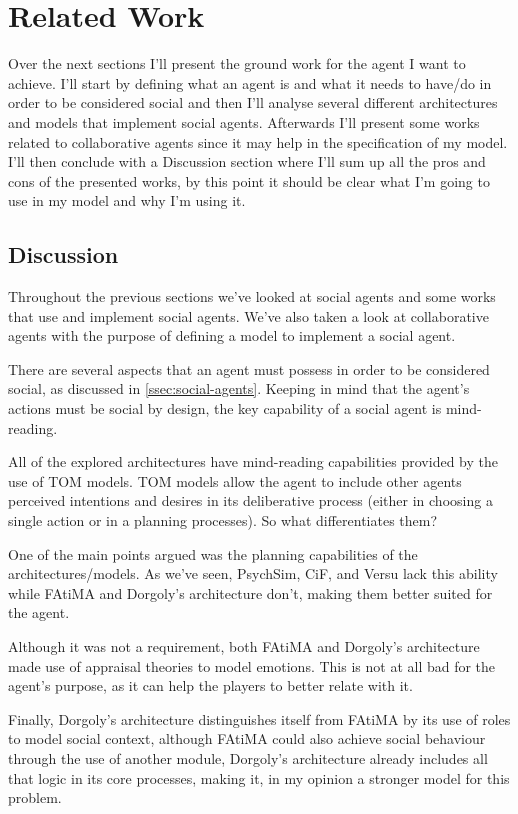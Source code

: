 \section{Related Work}
Over the next sections I'll present the ground work for the agent I want to achieve.
I'll start by defining what an agent is and what it needs to have/do in order to be considered social and then I'll analyse several different architectures and models that implement social agents.
Afterwards I'll present some works related to collaborative agents since it may help in the specification of my model.
I'll then conclude with a Discussion section where I'll sum up all the pros and cons of the presented works, by this point it should be clear what I'm going to use in my model and why I'm using it.












\subsection{Discussion}
Throughout the previous sections we've looked at social agents and some works that use and implement social agents.
We've also taken a look at collaborative agents with the purpose of defining a model to implement a social agent.

There are several aspects that an agent must possess in order to be considered social, as discussed in \ref{ssec:social-agents}.
Keeping in mind that the agent's actions must be social by design, the key capability of a social agent is mind-reading.

All of the explored architectures have mind-reading capabilities provided by the use of \ac{TOM} models.
\ac{TOM} models allow the agent to include other agents perceived intentions and desires in its deliberative process (either in choosing a single action or in a planning processes).
So what differentiates them?

One of the main points argued was the planning capabilities of the architectures/models.
As we've seen, PsychSim, \ac{CiF}, and Versu lack this ability while \ac{FAtiMA} and Dorgoly's architecture don't, making them better suited for the agent.

Although it was not a requirement, both \ac{FAtiMA} and Dorgoly's architecture made use of appraisal theories to model emotions.
This is not at all bad for the agent's purpose, as it can help the players to better relate with it.

Finally, Dorgoly's architecture distinguishes itself from \ac{FAtiMA} by its use of roles to model social context, although \ac{FAtiMA} could also achieve social behaviour through the use of another module, Dorgoly's architecture already includes all that logic in its core processes, making it, in my opinion a stronger model for this problem.
